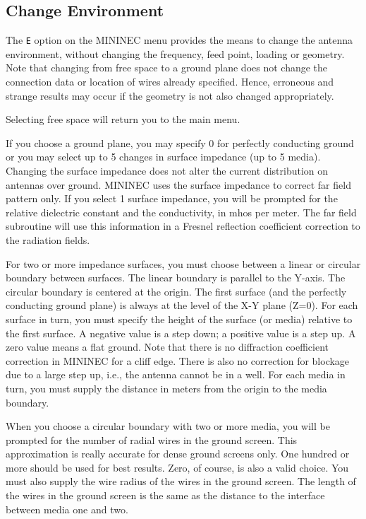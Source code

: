 \documentclass[12pt]{article}
\begin{document}
\subsection{Change Environment}
\label{sec-change-env}
The \verb+E+ option on the MININEC menu provides the means to change the
antenna environment, without changing the frequency, feed point, loading
or geometry. Note that changing from free space to a ground plane does
not change the connection data or location of wires already specified.
Hence, erroneous and strange results may occur if the geometry is not
also changed appropriately.

Selecting free space will return you to the main menu.

If you choose a ground plane, you may specify 0 for perfectly conducting
ground or you may select up to 5 changes in surface impedance (up to 5
media). Changing the surface impedance does not alter the current
distribution on antennas over ground. MININEC uses the surface impedance
to correct far field pattern only. If you select 1 surface impedance,
you will be prompted for the relative dielectric constant and the
conductivity, in mhos per meter. The far field subroutine will use this
information in a Fresnel reflection coefficient correction to the
radiation fields.

For two or more impedance surfaces, you must choose between a linear or
circular boundary between surfaces. The linear boundary is parallel to
the Y-axis. The circular boundary is centered at the origin. The first
surface (and the perfectly conducting ground plane) is always at the
level of the X-Y plane (Z=0). For each surface in turn, you must specify
the height of the surface (or media) relative to the first surface. A
negative value is a step down; a positive value is a step up. A zero
value means a flat ground. Note that there is no diffraction coefficient
correction in MININEC for a cliff edge. There is also no correction for
blockage due to a large step up, i.e., the antenna cannot be in a well.
For each media in turn, you must supply the distance in meters from the
origin to the media boundary.

When you choose a circular boundary with two or more media, you will be
prompted for the number of radial wires in the ground screen. This
approximation is really accurate for dense ground screens only. One
hundred or more should be used for best results. Zero, of course, is
also a valid choice. You must also supply the wire radius of the wires
in the ground screen. The length of the wires in the ground screen is
the same as the distance to the interface between media one and two.
\end{document}
